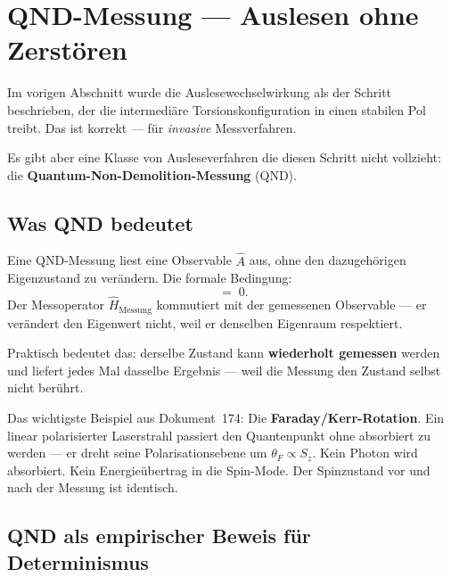 \section{QND-Messung --- Auslesen ohne Zerstören}
\label{sec:qnd}

Im vorigen Abschnitt wurde die Auslesewechselwirkung
als der Schritt beschrieben, der die intermediäre
Torsionskonfiguration in einen stabilen Pol treibt.
Das ist korrekt --- für \emph{invasive} Messverfahren.

Es gibt aber eine Klasse von Ausleseverfahren die
diesen Schritt nicht vollzieht:
die \textbf{Quantum-Non-Demolition-Messung} (QND).

\subsection{Was QND bedeutet}

Eine QND-Messung liest eine Observable $\hat{A}$ aus,
ohne den dazugehörigen Eigenzustand zu verändern.
Die formale Bedingung:
\begin{equation}
  [\hat{A},\; \hat{H}_\text{Messung}] \;=\; 0.
\end{equation}
Der Messoperator $\hat{H}_\text{Messung}$ kommutiert
mit der gemessenen Observable --- er verändert den
Eigenwert nicht, weil er denselben Eigenraum respektiert.

Praktisch bedeutet das: derselbe Zustand kann
\textbf{wiederholt gemessen} werden und liefert
jedes Mal dasselbe Ergebnis --- weil die Messung
den Zustand selbst nicht berührt.

Das wichtigste Beispiel aus Dokument~174:
Die \textbf{Faraday/Kerr-Rotation}.
Ein linear polarisierter Laserstrahl passiert den
Quantenpunkt ohne absorbiert zu werden ---
er dreht seine Polarisationsebene um $\theta_F \propto S_z$.
Kein Photon wird absorbiert. Kein Energieübertrag
in die Spin-Mode. Der Spinzustand vor und nach
der Messung ist identisch.

\subsection{QND als empirischer Beweis für Determinismus}
\label{sec:qnd-beweis}

